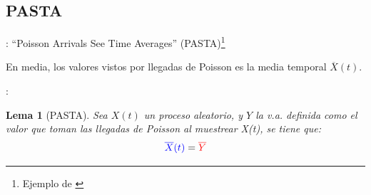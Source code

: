 \documentclass[xcolor={x11names}]{beamer}
\newtheorem{lema}{Lema}[section]
\newcommand{\red}[1]{{\color{red}#1}}
\newcommand{\blue}[1]{{\color{blue}#1}}
\begin{document}
\subsection{PASTA}
\begin{frame}{\secname: \subsecname}
    ``Poisson Arrivals See Time Averages'' (PASTA)\footnote{Ejemplo de \cite[Figura 3.17]{amable}}

    \vfill

    \begin{figure}
        
    \end{figure}

    En media, los \blue{valores} vistos por
    {\color{Firebrick1}llegadas} de Poisson
    es la media temporal $\overline{X}(t)$.

\end{frame}



\begin{frame}{\secname: \subsecname}
    \begin{lema}[PASTA]
        Sea \blue{$X(t)$} un proceso aleatorio,
        y \red{$Y$} la v.a. definida como el
        valor que toman las llegadas de Poisson
        al muestrear \blue{X(t)}, se tiene que:
        \begin{equation}
            \blue{\overline{X}(t)} = \red{\overline{Y}}
        \end{equation}
    \end{lema}
\end{frame}
\end{document}
